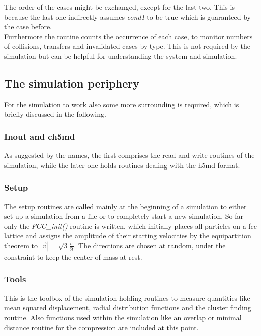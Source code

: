 The order of the cases might be exchanged, except for the last two. This is because the last one indirectly assumes \textit{cond1} to be true which is guaranteed by the case before.\\

Furthermore the routine counts the occurrence of each case, to monitor numbers of collisions, transfers and invalidated cases by type. This is not required by the simulation but can be helpful for understanding the system and simulation.\\

\subsection{The simulation periphery}
For the simulation to work also some more surrounding is required, which is briefly discussed in the following.
 
\subsubsection{Inout and ch5md}
As suggested by the names, the first comprises the read and write routines of the simulation, while the later one holds routines dealing with the h5md format.

\subsubsection{Setup}
The setup routines are called mainly at the beginning of a simulation to either set up a simulation from a file or to completely start a new simulation. So far only the \textit{FCC\_init()} routine is written, which initially places all particles on a fcc lattice and assigns the amplitude of their starting velocities by the equipartition theorem to $|\vec{v}| = \sqrt{3}\frac{\sigma}{\delta t}$. The directions are chosen at random, under the constraint to keep the center of mass at rest.

\subsubsection{Tools}
This is the toolbox of the simulation holding routines to measure quantities like mean squared displacement, radial distribution functions and the cluster finding routine. Also functions used within the simulation like an overlap or minimal distance routine for the compression are included at this point.\\

